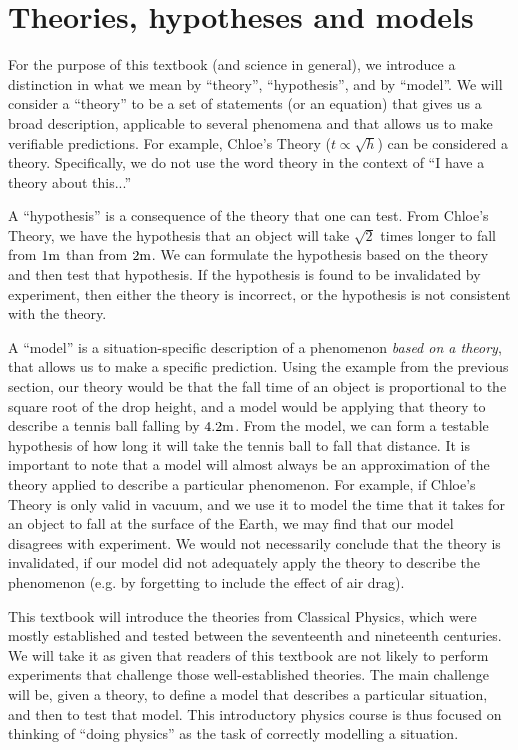 \documentclass[9pt,Preprint]{lapreprint}
\begin{document}
\section{Theories, hypotheses and models}

For the purpose of this textbook (and science in general), we introduce a distinction in what we mean by ``theory'', ``hypothesis'', and by ``model''. We will consider a ``theory'' to be a set of statements (or an equation) that gives us a broad description, applicable to several phenomena and that allows us to make verifiable predictions. For example, Chloe's Theory ($t \propto \sqrt{h}$) can be considered a theory. Specifically, we do not use the word theory in the context of ``I have a theory about this...''

A ``hypothesis'' is a consequence of the theory that one can test. From Chloe's Theory, we have the hypothesis that an object will take $\sqrt{2}$ times longer to fall from $1 {\rm m}$ than from $2 {\rm m}$. We can formulate the hypothesis based on the theory and then test that hypothesis. If the hypothesis is found to be invalidated by experiment, then either the theory is incorrect, or the hypothesis is not consistent with the theory.

A ``model'' is a situation-specific description of a phenomenon \textit{based on a theory}, that allows us to make a specific prediction. Using the example from the previous section, our theory would be that the fall time of an object is proportional to the square root of the drop height, and a model would be applying that theory to describe a tennis ball falling by $4.2 {\rm m}$. From the model, we can form a testable hypothesis of how long it will take the tennis ball to fall that distance. It is important to note that a model will almost always be an approximation of the theory applied to describe a particular phenomenon. For example, if Chloe's Theory is only valid in vacuum, and we use it to model the time that it takes for an object to fall at the surface of the Earth, we may find that our model disagrees with experiment. We would not necessarily conclude that the theory is invalidated, if our model did not adequately apply the theory to describe the phenomenon (e.g. by forgetting to include the effect of air drag).

This textbook will introduce the theories from Classical Physics, which were mostly established and tested between the seventeenth and nineteenth centuries. We will take it as given that readers of this textbook are not likely to perform experiments that challenge those well-established theories. The main challenge will be, given a theory, to define a model that describes a particular situation, and then to test that model. This introductory physics course is thus focused on thinking of ``doing physics'' as the task of correctly modelling a situation.
\end{document}
